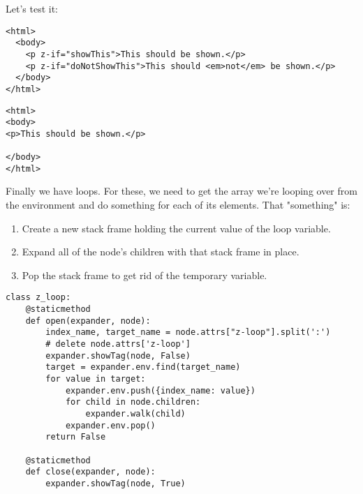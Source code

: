 \documentclass{scrbook}
\begin{document}
Let's test it:


\begin{lstlisting}[frame=single,frameround=tttt]
<html>
  <body>
    <p z-if="showThis">This should be shown.</p>
    <p z-if="doNotShowThis">This should <em>not</em> be shown.</p>
  </body>
</html>
\end{lstlisting}



\begin{lstlisting}[frame=single,frameround=tttt]
<html>
<body>
<p>This should be shown.</p>

</body>
</html>
\end{lstlisting}




Finally we have loops.
For these,
we need to get the array we're looping over from the environment
and do something for each of its elements.
That "something" is:

\begin{enumerate}

\item 

Create a new stack frame holding the current value of the loop variable.



\item 

Expand all of the node's children with that stack frame in place.



\item 

Pop the stack frame to get rid of the temporary variable.



\end{enumerate}


\begin{lstlisting}[frame=single,frameround=tttt]
class z_loop:
    @staticmethod
    def open(expander, node):
        index_name, target_name = node.attrs["z-loop"].split(':')
        # delete node.attrs['z-loop']
        expander.showTag(node, False)
        target = expander.env.find(target_name)
        for value in target:
            expander.env.push({index_name: value})
            for child in node.children:
                expander.walk(child)
            expander.env.pop()
        return False

    @staticmethod
    def close(expander, node):
        expander.showTag(node, True)
\end{lstlisting}
\end{document}
